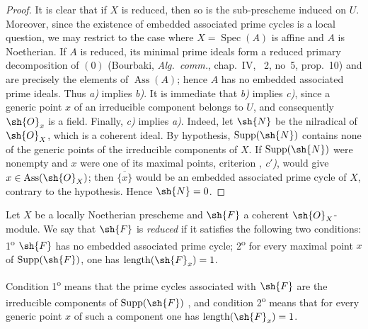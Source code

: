 \begin{proof}
It is clear that if $X$ is reduced, then so is the sub-prescheme induced on $U$.
Moreover, since the existence of embedded associated prime cycles is a local question, we may restrict to the case where $X=\operatorname{Spec}(A)$ is affine and $A$ is Noetherian.
If $A$ is reduced, its minimal prime ideals form a reduced primary decomposition of $(0)$ (Bourbaki, \emph{Alg.\ comm.}, chap.~IV, \textsection~2, no~5, prop.~10) and are precisely the elements of $\operatorname{Ass}(A)$; hence $A$ has no embedded associated prime ideals.  Thus \emph{a)} implies \emph{b)}.
It is immediate that \emph{b)} implies \emph{c)}, since a generic point $x$ of an irreducible component belongs to $U$, and consequently $\sh{O}_x$ is a field.
Finally, \emph{c)} implies \emph{a)}.  Indeed, let $\sh{N}$ be the nilradical of $\sh{O}_X$, which is a coherent ideal.  By hypothesis, $\operatorname{Supp}(\sh{N})$ contains none of the generic points of the irreducible components of $X$.  If $\operatorname{Supp}(\sh{N})$ were nonempty and $x$ were one of its maximal points, criterion , \emph{c$'$)}, would give $x\in\operatorname{Ass}(\sh{O}_X)$; then $\overline{\{x\}}$ would be an embedded associated prime cycle of $X$, contrary to the hypothesis.  Hence $\sh{N}=0$.
\end{proof}

\begin{definition}[3.2.2]
\label{IV.3.2.2}
Let $X$ be a locally Noetherian prescheme and $\sh{F}$ a coherent $\sh{O}_X$-module.
We say that $\sh{F}$ is \emph{reduced} if it satisfies the following two conditions: 1\textsuperscript{o} $\sh{F}$ has no embedded associated prime cycle; 2\textsuperscript{o} for every maximal point $x$ of $\operatorname{Supp}(\sh{F})$, one has $\operatorname{length}(\sh{F}_x)=1$.
\end{definition}

Condition 1\textsuperscript{o} means that the prime cycles associated with $\sh{F}$ are the irreducible components of $\operatorname{Supp}(\sh{F})$ , and condition 2\textsuperscript{o} means that for every generic point $x$ of such a component one has $\operatorname{length}(\sh{F}_x)=1$.

